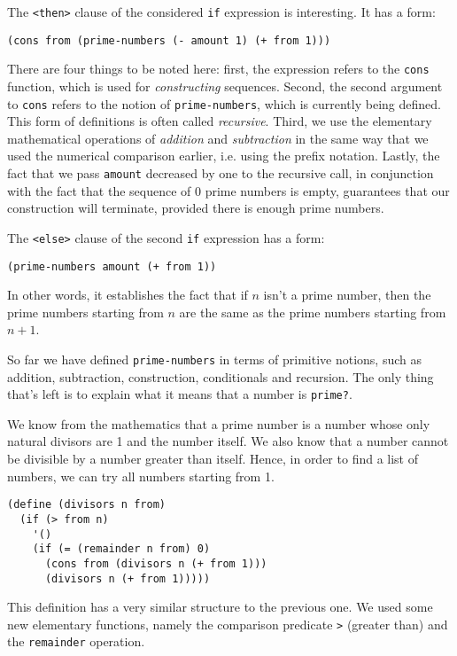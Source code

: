 The \texttt{<then>} clause of the considered \texttt{if} expression
is interesting. It has a form:

\texttt{(cons from (prime-numbers (- amount 1) (+ from 1)))}

There are four things to be noted here: first, the expression
refers to the \texttt{cons} function, which is used for
\textit{constructing} sequences. Second, the second argument
to \texttt{cons} refers to the notion of \texttt{prime-numbers},
which is currently being defined.
This form of definitions is often called \textit{recursive}. Third,
we use the elementary mathematical operations of \textit{addition}
and \textit{subtraction} in the same way that we used the numerical
comparison earlier, i.e. using the prefix notation. Lastly, the
fact that we pass \texttt{amount} decreased by one to the recursive
call, in conjunction with the fact that the sequence of 0 prime
numbers is empty, guarantees that our construction will terminate,
provided there is enough prime numbers.

The \texttt{<else>} clause of the second \texttt{if} expression
has a form:

\texttt{(prime-numbers amount (+ from 1))}

In other words, it establishes the fact that if $n$ isn't
a prime number, then the prime numbers starting from $n$ are
the same as the prime numbers starting from $n+1$.

So far we have defined \texttt{prime-numbers} in terms of primitive
notions, such as addition, subtraction, construction, conditionals
and recursion. The only thing that's left is to explain what it means
that a number is \texttt{prime?}.

We know from the mathematics that a prime number is a number whose
only natural divisors are 1 and the number itself. We also know
that a number cannot be divisible by a number greater than itself.
Hence, in order to find a list of numbers, we can try all numbers
starting from 1.

\begin{Verbatim}[samepage=true]
(define (divisors n from)
  (if (> from n)
    '()
    (if (= (remainder n from) 0)
      (cons from (divisors n (+ from 1)))
      (divisors n (+ from 1)))))
\end{Verbatim}

This definition has a very similar structure to the previous one.
We used some new elementary functions, namely the comparison predicate
\texttt{>} (greater than) and the \texttt{remainder} operation.

